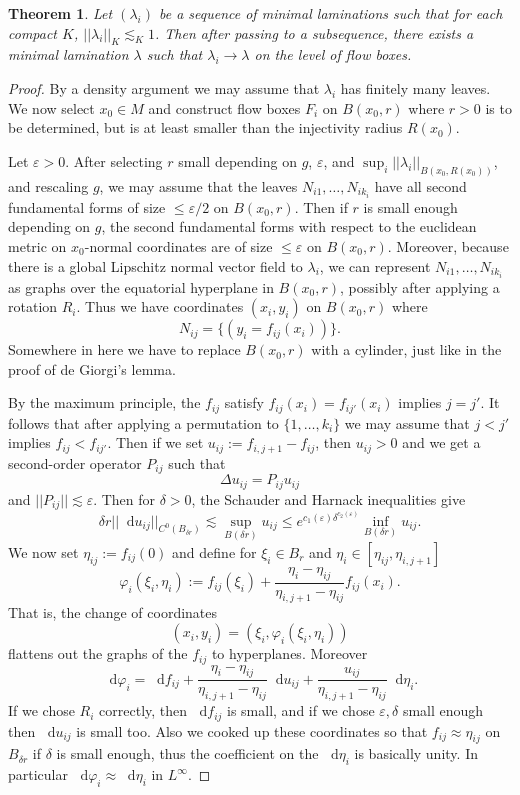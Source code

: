 \documentclass[reqno,10pt]{amsart}
\newcommand*\dif{\mathop{}\!\mathrm{d}}
\newtheorem{theorem}{Theorem}[section]
\theoremstyle{definition}
\numberwithin{equation}{section}
\begin{document}
\begin{theorem}
Let $(\lambda_i)$ be a sequence of minimal laminations such that for each compact $K$, $||\lambda_i||_K \lesssim_K 1$.
Then after passing to a subsequence, there exists a minimal lamination $\lambda$ such that $\lambda_i \to \lambda$ on the level of flow boxes.
\end{theorem}
\begin{proof}
By a density argument we may assume that $\lambda_i$ has finitely many leaves.
We now select $x_0 \in M$ and construct flow boxes $F_i$ on $B(x_0, r)$ where $r > 0$ is to be determined, but is at least smaller than the injectivity radius $R(x_0)$.

Let $\varepsilon > 0$.
After selecting $r$ small depending on $g$, $\varepsilon$, and $\sup_i ||\lambda_i||_{B(x_0, R(x_0))}$, and rescaling $g$, we may assume that the leaves $N_{i1}, \dots, N_{ik_i}$ have all second fundamental forms of size $\leq \varepsilon/2$ on $B(x_0, r)$.
Then if $r$ is small enough depending on $g$, the second fundamental forms with respect to the euclidean metric on $x_0$-normal coordinates are of size $\leq \varepsilon$ on $B(x_0, r)$.
Moreover, because there is a global Lipschitz normal vector field to $\lambda_i$, we can represent $N_{i1}, \dots, N_{ik_i}$ as graphs over the equatorial hyperplane in $B(x_0, r)$, possibly after applying a rotation $R_i$.
Thus we have coordinates $(x_i, y_i)$ on $B(x_0, r)$ where
$$N_{ij} = \{(y_i = f_{ij}(x_i))\}.$$
Somewhere in here we have to replace $B(x_0, r)$ with a cylinder, just like in the proof of de Giorgi's lemma.

By the maximum principle, the $f_{ij}$ satisfy $f_{ij}(x_i) = f_{ij'}(x_i)$ implies $j = j'$.
It follows that after applying a permutation to $\{1, \dots, k_i\}$ we may assume that $j < j'$ implies $f_{ij} < f_{ij'}$.
Then if we set $u_{ij} := f_{i,j+1} - f_{ij}$, then $u_{ij} > 0$ and we get a second-order operator $P_{ij}$ such that
$$\Delta u_{ij} = P_{ij} u_{ij}$$
and $||P_{ij}|| \lesssim \varepsilon$.
Then for $\delta > 0$, the Schauder and Harnack inequalities give
$$\delta r ||\dif u_{ij}||_{C^0(B_{\delta r})} \lesssim \sup_{B(\delta r)} u_{ij} \leq e^{c_1(\varepsilon) \delta^{c_2(\varepsilon)}} \inf_{B(\delta r)} u_{ij}.$$
We now set $\eta_{ij} := f_{ij}(0)$ and define for $\xi_i \in B_r$ and $\eta_i \in [\eta_{ij}, \eta_{i,j+1}]$
$$\varphi_i(\xi_i, \eta_i) := f_{ij}(\xi_i) + \frac{\eta_i - \eta_{ij}}{\eta_{i,j+1} - \eta_{ij}} f_{ij}(x_i).$$
That is, the change of coordinates
$$(x_i, y_i) = (\xi_i, \varphi_i(\xi_i, \eta_i))$$
flattens out the graphs of the $f_{ij}$ to hyperplanes.
Moreover
$$\dif \varphi_i = \dif f_{ij} + \frac{\eta_i - \eta_{ij}}{\eta_{i,j+1} - \eta_{ij}} \dif u_{ij} + \frac{u_{ij}}{\eta_{i,j+1} - \eta_{ij}} \dif \eta_i.$$
If we chose $R_i$ correctly, then $\dif f_{ij}$ is small, and if we chose $\varepsilon, \delta$ small enough then $\dif u_{ij}$ is small too.
Also we cooked up these coordinates so that $f_{ij} \approx \eta_{ij}$ on $B_{\delta r}$ if $\delta$ is small enough, thus the coefficient on the $\dif \eta_i$ is basically unity.
In particular $\dif \varphi_i \approx \dif \eta_i$ in $L^\infty$.


\end{proof}
\end{document}
